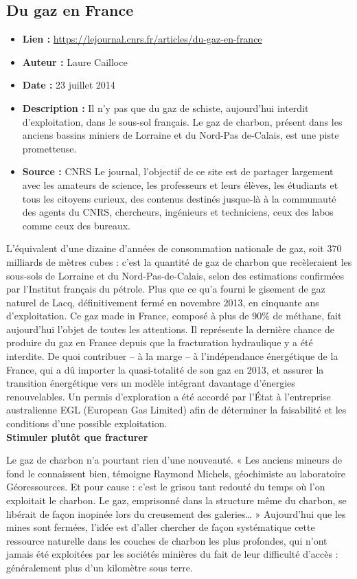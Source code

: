 \documentclass[8pt]{article}
\begin{document}
\newpage
\subsection{Du gaz en France}
 
\begin{itemize}
	\item \textbf{Lien : }  \url{https://lejournal.cnrs.fr/articles/du-gaz-en-france} 
	\item \textbf{Auteur : } Laure Cailloce
	\item \textbf{Date : } 23 juillet 2014
	\item \textbf{Description : } Il n’y pas que du gaz de schiste, aujourd’hui interdit d’exploitation, dans le sous-sol français. Le gaz de charbon, présent dans les anciens bassins miniers de Lorraine et du Nord-Pas de-Calais, est une piste prometteuse.
	\item \textbf{Source : } CNRS Le journal, l'objectif de ce site est de partager largement avec les amateurs de science, les professeurs et leurs élèves, les étudiants et tous les citoyens curieux, des contenus destinés jusque-là à la communauté des agents du CNRS, chercheurs, ingénieurs et techniciens, ceux des labos comme ceux des bureaux.
\end{itemize}

L’équivalent d’une dizaine d’années de consommation nationale de gaz, soit 370 milliards de mètres cubes : c’est la quantité de gaz de charbon que recèleraient les sous-sols de Lorraine et du Nord-Pas-de-Calais, selon des estimations confirmées par l’Institut français du pétrole. Plus que ce qu’a fourni le gisement de gaz naturel de Lacq, définitivement fermé en novembre 2013, en cinquante ans d’exploitation. Ce gaz made in France, composé à plus de 90\% de méthane, fait aujourd’hui l’objet de toutes les attentions. Il représente la dernière chance de produire du gaz en France depuis que la fracturation hydraulique y a été interdite. De quoi contribuer – à la marge – à l’indépendance énergétique de la France, qui a dû importer la quasi-totalité de son gaz en 2013, et assurer la transition énergétique vers un modèle intégrant davantage d’énergies renouvelables. Un permis d’exploration a été accordé par l’État à l’entreprise australienne EGL (European Gas Limited) afin de déterminer la faisabilité et les conditions d’une possible exploitation. \\

\textbf{Stimuler plutôt que fracturer}

Le gaz de charbon n’a pourtant rien d’une nouveauté. « Les anciens mineurs de fond le connaissent bien, témoigne Raymond Michels, géochimiste au laboratoire Géoressources. Et pour cause : c’est le grisou tant redouté du temps où l’on exploitait le charbon. Le gaz, emprisonné dans la structure même du charbon, se libérait de façon inopinée lors du creusement des galeries… » Aujourd’hui que les mines sont fermées, l’idée est d’aller chercher de façon systématique cette ressource naturelle dans les couches de charbon les plus profondes, qui n’ont jamais été exploitées par les sociétés minières du fait de leur difficulté d’accès : généralement plus d’un kilomètre sous terre.  \\
\end{document}
